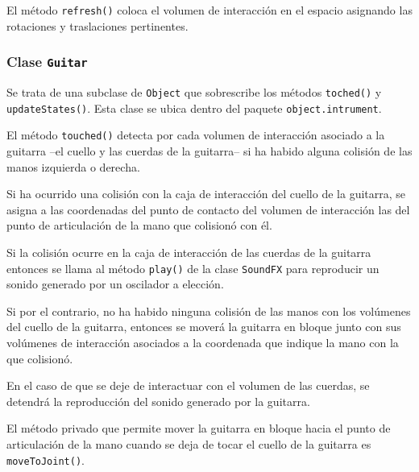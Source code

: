 \documentclass[10pt,a4paper]{report}
\begin{document}
	
	
	El método \texttt{refresh()} coloca el volumen de interacción en el espacio asignando las rotaciones y traslaciones pertinentes.
	
	
	
	\subsubsection{Clase \texttt{Guitar}}
	Se trata de una subclase de \texttt{Object} que sobrescribe los métodos \texttt{toched()} y \texttt{updateStates()}. Esta clase se ubica dentro del paquete \texttt{object.intrument}.
	
	El método \texttt{touched()} detecta por cada volumen de interacción asociado a la guitarra --el cuello y las cuerdas de la guitarra-- si ha habido alguna colisión de las manos izquierda o derecha. 
	
	Si ha ocurrido una colisión con la caja de interacción del cuello de la guitarra, se asigna a las coordenadas del punto de contacto del volumen de interacción las del punto de articulación de la mano que colisionó con él. 
	
	Si la colisión ocurre en la caja de interacción de las cuerdas de la guitarra entonces se llama al método \texttt{play()} de la clase \texttt{SoundFX} para reproducir un sonido generado por un oscilador a elección.
	
	Si por el contrario, no ha habido ninguna colisión de las manos con los volúmenes del cuello de la guitarra, entonces se moverá la guitarra en bloque junto con sus volúmenes de interacción asociados a la coordenada que indique la mano con la que colisionó.
	
	En el caso de que se deje de interactuar con el volumen de las cuerdas, se detendrá la reproducción del sonido generado por la guitarra.
	
	
	
	El método privado que permite mover la guitarra en bloque hacia el punto de articulación de la mano cuando se deja de tocar el cuello de la guitarra es \texttt{moveToJoint()}.
	
	
	
\end{document}
